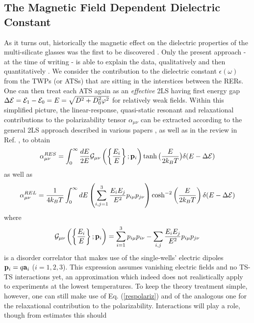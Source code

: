 \documentclass[10pt]{article}
\begin{document}
\subsection{The Magnetic Field Dependent Dielectric Constant}
As it turns out, historically the magnetic effect on the dielectric properties of the
multi-silicate glasses was the first to be discovered \cite{Str2000}. Only the present 
approach - at the time of writing - is able to explain the data, qualitatively 
\cite{Jug2009} and then quantitatively \cite{Jug2014}.
We consider the contribution to the dielectric constant $\epsilon(\omega)$ 
from the TWPs (or ATSs) that are sitting in the interstices between the RERs. One 
can then treat each ATS again as an {\it effective} 2LS having first energy gap 
$\Delta{\cal E}={\cal E}_1-{\cal E}_0=E=\sqrt{D^2+D_0^2\varphi^2}$ for 
relatively weak fields. Within this simplified picture, the linear-response, quasi-static 
resonant and relaxational contributions to the polarizability tensor $\alpha_{\mu\nu}$ 
can be extracted according to the general 2LS approach described in various papers 
\cite{Car1994}, as well as in the review in Ref. \cite{JBK2016}, to obtain
\begin{equation}
\alpha^{RES}_{\mu\nu}=\int_0^{\infty}\frac{dE}{2E}
{\cal G}_{\mu\nu}\left ( \left\{ \frac{E_i}{E} \right\};{{\bf p}_i}\right )
\tanh\big( \frac{E}{2k_{B}T} \big)\delta(E-\Delta{\cal E})
\label{respolariz}
\end{equation}
as well as
\begin{equation}
\alpha^{REL}_{\mu\nu}=\frac{1}{4k_{B}T}\int_0^{\infty} dE \left( \sum_{i,j=1}^{3}
\frac{E_iE_j}{E^2}p_{i\mu}p_{j\nu} \right )
\cosh^{-2}\left( \frac{E}{2k_{B}T} \right) \delta(E-\Delta{\cal E})
\label{relpolariz}
\end{equation}
where
\begin{equation}
{\cal G}_{\mu\nu}\left ( \left\{ \frac{E_i}{E} \right\} ;{{\bf p}_i}\right )=
\sum_{i=1}^{3}p_{i\mu}p_{i\nu}-\sum_{i,j}\frac{E_iE_j}{E^2}p_{i\mu}p_{j\nu}
\label{geomcorr}
\end{equation}
is a disorder correlator that makes use of the single-wells' electric dipoles 
${\bf p}_i=q{\bf a}_i$ ($i=1,2,3$). 
This expression assumes vanishing electric fields and no TS-TS interactions yet, an
approximation which indeed does not realistically apply to experiments at the lowest 
temperatures. To keep the theory treatment simple, however, one can still make use 
of Eq. (\ref{respolariz}) and of the analogous one for the relaxational contribution to 
the polarizability.  Interactions will play a role, though from estimates this should 
\end{document}
